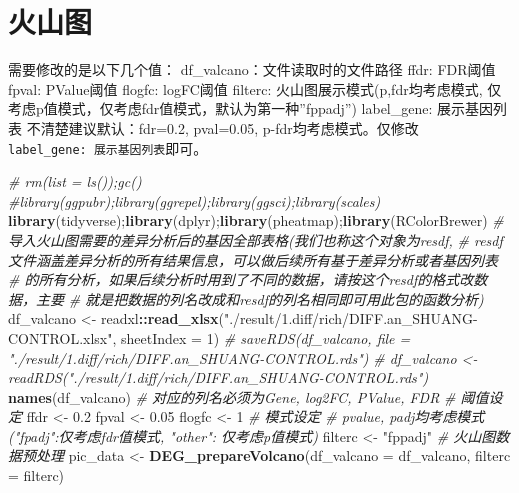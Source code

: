 \documentclass[
]{book}
\newenvironment{Shaded}{\begin{snugshade}}{\end{snugshade}}
\newcommand{\AttributeTok}[1]{\textcolor[rgb]{0.13,0.29,0.53}{#1}}
\newcommand{\CommentTok}[1]{\textcolor[rgb]{0.56,0.35,0.01}{\textit{#1}}}
\newcommand{\DecValTok}[1]{\textcolor[rgb]{0.00,0.00,0.81}{#1}}
\newcommand{\FloatTok}[1]{\textcolor[rgb]{0.00,0.00,0.81}{#1}}
\newcommand{\FunctionTok}[1]{\textcolor[rgb]{0.13,0.29,0.53}{\textbf{#1}}}
\newcommand{\NormalTok}[1]{#1}
\newcommand{\OtherTok}[1]{\textcolor[rgb]{0.56,0.35,0.01}{#1}}
\newcommand{\SpecialCharTok}[1]{\textcolor[rgb]{0.81,0.36,0.00}{\textbf{#1}}}
\newcommand{\StringTok}[1]{\textcolor[rgb]{0.31,0.60,0.02}{#1}}
\begin{document}
\hypertarget{deg-valcano}{%
\section{火山图}\label{deg-valcano}}

需要修改的是以下几个值：
df\_valcano：文件读取时的文件路径
ffdr: FDR阈值
fpval: PValue阈值
flogfc: logFC阈值
filterc: 火山图展示模式(p,fdr均考虑模式, 仅考虑p值模式，仅考虑fdr值模式，默认为第一种''fppadj'')
label\_gene: 展示基因列表
不清楚建议默认：fdr=0.2, pval=0.05, p-fdr均考虑模式。仅修改\texttt{label\_gene:\ 展示基因列表}即可。

\begin{Shaded}
\begin{Highlighting}[]
\CommentTok{\# rm(list = ls());gc()}
\CommentTok{\#library(ggpubr);library(ggrepel);library(ggsci);library(scales)}
\FunctionTok{library}\NormalTok{(tidyverse);}\FunctionTok{library}\NormalTok{(dplyr);}\FunctionTok{library}\NormalTok{(pheatmap);}\FunctionTok{library}\NormalTok{(RColorBrewer)}
\CommentTok{\# 导入火山图需要的差异分析后的基因全部表格(我们也称这个对象为resdf,}
\CommentTok{\#  resdf文件涵盖差异分析的所有结果信息，可以做后续所有基于差异分析或者基因列表}
\CommentTok{\#  的所有分析，如果后续分析时用到了不同的数据，请按这个resdf的格式改数据，主要}
\CommentTok{\#  就是把数据的列名改成和resdf的列名相同即可用此包的函数分析)}
\NormalTok{df\_valcano }\OtherTok{\textless{}{-}}\NormalTok{ readxl}\SpecialCharTok{::}\FunctionTok{read\_xlsx}\NormalTok{(}\StringTok{"./result/1.diff/rich/DIFF.an\_SHUANG{-}CONTROL.xlsx"}\NormalTok{,}
                                \AttributeTok{sheetIndex =} \DecValTok{1}\NormalTok{)}
\CommentTok{\# saveRDS(df\_valcano, file = "./result/1.diff/rich/DIFF.an\_SHUANG{-}CONTROL.rds")}
\CommentTok{\# df\_valcano \textless{}{-} readRDS("./result/1.diff/rich/DIFF.an\_SHUANG{-}CONTROL.rds")}
\FunctionTok{names}\NormalTok{(df\_valcano) }\CommentTok{\# 对应的列名必须为Gene, log2FC, PValue, FDR}
\CommentTok{\# 阈值设定}
\NormalTok{ffdr }\OtherTok{\textless{}{-}} \FloatTok{0.2}
\NormalTok{fpval }\OtherTok{\textless{}{-}} \FloatTok{0.05}
\NormalTok{flogfc }\OtherTok{\textless{}{-}} \DecValTok{1}
\CommentTok{\# 模式设定}
\CommentTok{\# pvalue, padj均考虑模式 ("fpadj":仅考虑fdr值模式, "other": 仅考虑p值模式)}
\NormalTok{filterc }\OtherTok{\textless{}{-}} \StringTok{"fppadj"} 
\CommentTok{\# 火山图数据预处理}
\NormalTok{pic\_data }\OtherTok{\textless{}{-}} \FunctionTok{DEG\_prepareVolcano}\NormalTok{(}\AttributeTok{df\_valcano =}\NormalTok{ df\_valcano, }\AttributeTok{filterc =}\NormalTok{ filterc)}


\end{Highlighting}
\end{Shaded}
\end{document}
